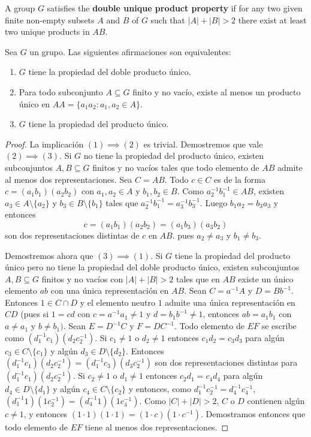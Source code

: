 A group $G$ satisfies the \textbf{double unique product property} if for any two given finite non-empty 
subsets $A$ and $B$ of $G$ such that $|A|+|B|>2$ there exist at least two unique products in $AB$. 

\begin{theorem}[Strojnowski]
	\label{thm:Strojnowski}
	Sea $G$ un grupo. Las siguientes afirmaciones son equivalentes:
	\begin{enumerate}
		\item $G$ tiene la propiedad del doble producto único.
		\item Para todo subconjunto $A\subseteq G$ finito y no vacío, existe al
			menos un producto único en $AA=\{a_1a_2:a_1,a_2\in A\}$.
		\item $G$ tiene la propiedad del producto único.
	\end{enumerate}
\end{theorem}

\begin{proof}
	La implicación $(1)\implies(2)$ es trivial.  Demostremos que vale
	$(2)\implies(3)$. Si $G$ no tiene la propiedad del producto único, existen
	subconjuntos $A,B\subseteq G$ finitos y no vacíos tales que todo elemento
	de $AB$ admite al menos dos representaciones. Sea $C=AB$. Todo $c\in C$ es
	de la forma $c=(a_1b_1)(a_2b_2)$ con $a_1,a_2\in A$ y $b_1,b_2\in B$. Como
	$a_2^{-1}b_1^{-1}\in AB$, existen $a_3\in A\setminus\{a_2\}$ y $b_3\in B\setminus\{b_1\}$ tales que
	$a_2^{-1}b_1^{-1}=a_3^{-1}b_3^{-1}$. Luego $b_1a_2=b_3a_3$ y entonces
	\[
	c=(a_1b_1)(a_2b_2)=(a_1b_3)(a_3b_2)
	\]
	son dos representaciones distintas de $c$ en $AB$.
	pues $a_2\ne a_3$ y $b_1\ne b_3$.

	Demostremos ahora que $(3)\implies(1)$. Si $G$ tiene la propiedad del
	producto único pero no tiene la propiedad del doble producto único, existen
	subconjuntos $A,B\subseteq G$ finitos y no vacíos con $|A|+|B|>2$ tales que
	en $AB$ existe un único elemento $ab$ con una única representación en $AB$.
	Sean $C=a^{-1}A$ y $D=Bb^{-1}$. Entonces $1\in C\cap D$ y el elemento
	neutro $1$ admite una única representación en $CD$ (pues si $1=cd$ con
	$c=a^{-1}a_1\ne 1$ y $d=b_1b^{-1}\ne 1$, entonces $ab=a_1b_1$ con $a\ne
	a_1$ y $b\ne b_1)$. Sean $E=D^{-1}C$ y $F=DC^{-1}$. Todo elemento de $EF$
	se escribe como $(d_1^{-1}c_1)(d_2c_2^{-1})$. Si $c_1\ne 1$ o $d_2\ne 1$
	entonces $c_1d_2=c_3d_3$ para algún $c_3\in C\setminus\{c_1\}$ y algún
	$d_3\in D\setminus\{d_2\}$. Entonces
	$(d_1^{-1}c_1)(d_2c_2^{-1})=(d_1^{-1}c_3)(d_3c_2^{-1})$ son dos
	representaciones distintas para $(d_1^{-1}c_1)(d_2c_2^{-1})$. Si $c_2\ne 1$
	o $d_1\ne 1$ entonces $c_2d_1=c_4d_4$ para algún $d_4\in D\setminus\{d_1\}$
	y algún $c_4\in C\setminus\{c_2\}$ y entonces, como
	$d_1^{-1}c_2^{-1}=d_4^{-1}c_4^{-1}$,
	$(d_1^{-1}1)(1c_2^{-1})=(d_4^{-1}1)(1c_4^{-1})$.  Como $|C|+|D|>2$, $C$ o
	$D$ contienen algún $c\ne1$, y entonces $(1\cdot 1)(1\cdot 1)=(1\cdot
	c)(1\cdot c^{-1})$. Demostramos entonces que todo elemento de $EF$ tiene al
	menos dos representaciones. 
\end{proof}

